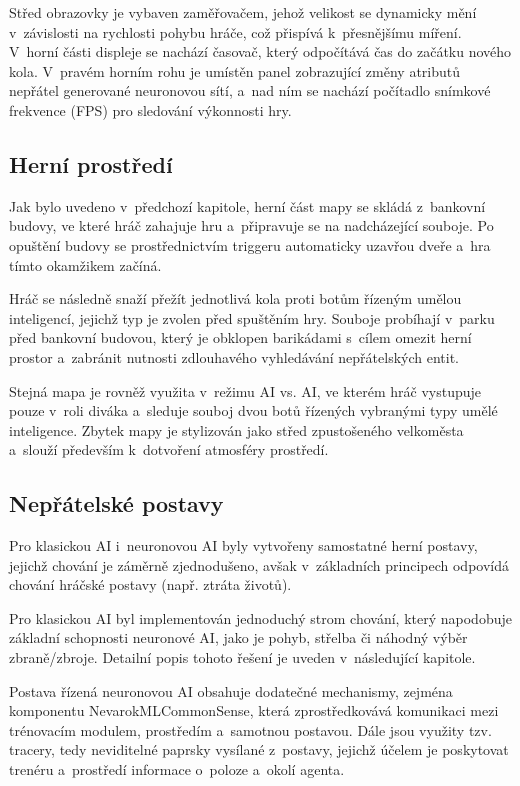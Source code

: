Střed obrazovky je vybaven zaměřovačem, jehož velikost se dynamicky mění v~závislosti na rychlosti pohybu hráče, což přispívá k~přesnějšímu míření. V~horní části displeje se nachází časovač, který odpočítává čas do začátku nového kola. V~pravém horním rohu je umístěn panel zobrazující změny atributů nepřátel generované neuronovou sítí, a~nad ním se nachází počítadlo snímkové frekvence (FPS) pro sledování výkonnosti hry.

\subsection{Herní prostředí}
Jak bylo uvedeno v~předchozí kapitole, herní část mapy se skládá z~bankovní budovy, ve které hráč zahajuje hru a~připravuje se na nadcházející souboje. Po opuštění budovy se prostřednictvím triggeru automaticky uzavřou dveře a~hra tímto okamžikem začíná.

Hráč se následně snaží přežít jednotlivá kola proti botům řízeným umělou inteligencí, jejichž typ je zvolen před spuštěním hry. Souboje probíhají v~parku před bankovní budovou, který je obklopen barikádami s~cílem omezit herní prostor a~zabránit nutnosti zdlouhavého vyhledávání nepřátelských entit.

Stejná mapa je rovněž využita v~režimu AI vs. AI, ve kterém hráč vystupuje pouze v~roli diváka a~sleduje souboj dvou botů řízených vybranými typy umělé inteligence. Zbytek mapy je stylizován jako střed zpustošeného velkoměsta a~slouží především k~dotvoření atmosféry prostředí.

\subsection{Nepřátelské postavy}
Pro klasickou AI i~neuronovou AI byly vytvořeny samostatné herní postavy, jejichž chování je záměrně zjednodušeno, avšak v~základních principech odpovídá chování hráčské postavy (např. ztráta životů).

Pro klasickou AI byl implementován jednoduchý strom chování, který napodobuje základní schopnosti neuronové AI, jako je pohyb, střelba či náhodný výběr zbraně/zbroje. Detailní popis tohoto řešení je uveden v~následující kapitole.

Postava řízená neuronovou AI obsahuje dodatečné mechanismy, zejména komponentu NevarokMLCommonSense, která zprostředkovává komunikaci mezi trénovacím modulem, prostředím a~samotnou postavou. Dále jsou využity tzv. tracery, tedy neviditelné paprsky vysílané z~postavy, jejichž účelem je poskytovat trenéru a~prostředí informace o~poloze a~okolí agenta.

